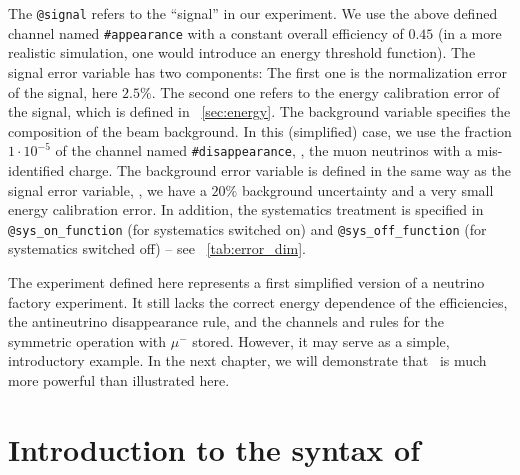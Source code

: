 The {\tt @signal} refers to the ``signal'' in our experiment. We use the
above defined channel named {\tt \#appearance} with a constant overall
efficiency of $0.45$ (in a more realistic simulation, one would introduce an
energy threshold function). The signal error variable has two components: 
The first one is the normalization error of the signal, here $2.5\%$. The second 
one refers to the energy calibration error of the signal, which is defined 
in \Sec~\ref{sec:energy}. The background variable
specifies the composition of the beam background. In this (simplified) case, we
use the fraction $1\cdot 10^{-5}$ of the channel named {\tt \#disappearance}, \ie , the muon neutrinos with a mis-identified charge. 
The background error variable is defined in the same way as the signal error variable, \ie , we have a $20\%$ background uncertainty and a very small energy calibration error. In addition, the systematics treatment is specified
in {\tt @sys\_on\_function} (for systematics switched on) and {\tt @sys\_off\_function} (for systematics switched off) -- see \Tab~\ref{tab:error_dim}. 

The experiment defined here represents a first simplified version of a neutrino factory experiment. It still lacks the correct energy dependence of the efficiencies, the antineutrino disappearance rule, and the channels and rules for the symmetric operation with $\mu^-$ stored. However, it may serve as a simple, introductory example. In the next chapter, we will demonstrate that \AEDL\ is much more powerful than illustrated here.


\section{Introduction to the syntax of \AEDL }
\label{sec:syntax}

